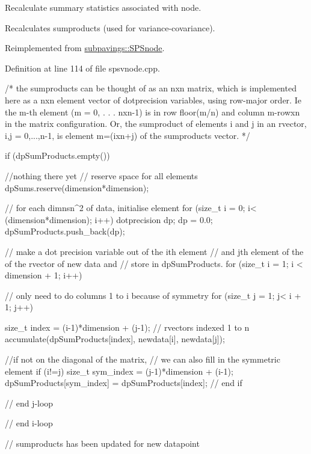 \-Recalculate summary statistics associated with node. 

\-Recalculates sumproducts (used for variance-\/covariance). 

\-Reimplemented from \hyperlink{classsubpavings_1_1SPSnode_ab49e57afe0939b41930e0cbb22c9ba8a}{subpavings\-::\-S\-P\-Snode}.



\-Definition at line 114 of file spsvnode.\-cpp.


\begin{DoxyCode}
    {
        /* the sumproducts can be thought of as an nxn matrix,
        which is implemented here as a nxn element vector of
        dotprecision variables, using row-major order.
        Ie the m-th element (m = 0, . . . nxn-1) is in row floor(m/n)
        and column m-rowxn in the matrix configuration.
        Or, the sumproduct of elements i and j in an rvector,
        i,j = 0,...,n-1, is element m=(ixn+j) of the sumproducts
        vector. */

        if (dpSumProducts.empty()) {    //nothing there yet
            // reserve space for all elements
            dpSums.reserve(dimension*dimension);

            // for each dimnsn^2 of data, initialise element
            for (size_t i = 0; i< (dimension*dimension); i++) {
                dotprecision dp;
                dp = 0.0;
                dpSumProducts.push_back(dp);
            }
        }

        // make a dot precision variable out of the ith element
        // and jth element of the of the rvector of new data and
        // store in dpSumProducts.
        for (size_t i = 1; i < dimension + 1; i++) {
            // only need to do columns 1 to i because of symmetry
            for (size_t j = 1; j< i + 1; j++) {

                size_t index = (i-1)*dimension + (j-1);
                // rvectors indexed 1 to n
                accumulate(dpSumProducts[index],
                        newdata[i], newdata[j]);

                //if not on the diagonal of the matrix,
                // we can also fill in the symmetric element
                if (i!=j) {
                    size_t sym_index = (j-1)*dimension
                        + (i-1);
                    dpSumProducts[sym_index] =
                        dpSumProducts[index];
                } // end if
            }// end j-loop
        }// end i-loop

        // sumproducts has been updated for new datapoint
    }
\end{DoxyCode}
